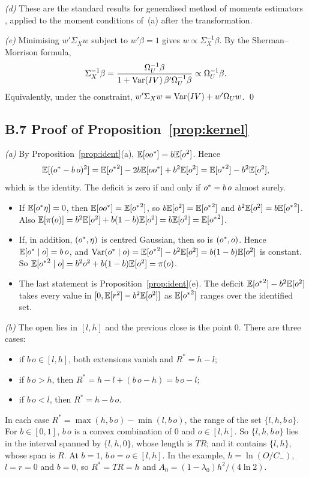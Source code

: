 \emph{(d)} These are the standard results for generalised method of moments estimators
\citep{Hansen1982}, applied to the moment conditions of~(a) after the transformation.

\emph{(e)} Minimising $w'\Sigma_Xw$ subject to $w'\beta=1$ gives $w\propto\Sigma_X^{-1}\beta$. By
the Sherman--Morrison formula,
\[
  \Sigma_X^{-1}\beta=\frac{\Omega_U^{-1}\beta}{1+\operatorname{Var}(IV)\,\beta'\Omega_U^{-1}\beta}\propto\Omega_U^{-1}\beta.
\]
Equivalently, under the constraint, $w'\Sigma_Xw=\operatorname{Var}(IV)+w'\Omega_Uw$. \qed

\subsection*{B.7 Proof of Proposition~\ref{prop:kernel}}

\emph{(a)} By Proposition~\ref{prop:ident}(a), $\mathbb{E}[o{o^{*}}]=b\mathbb{E}[o^2]$. Hence
\[
  \mathbb{E}[({o^{*}}-b\,o)^2]=\mathbb{E}[{o^{*}}^2]-2b\mathbb{E}[o{o^{*}}]+b^2\mathbb{E}[o^2]=\mathbb{E}[{o^{*}}^2]-b^2\mathbb{E}[o^2],
\]
which is the identity. The deficit is zero if and only if ${o^{*}}=b\,o$ almost surely.
\begin{itemize}
  \item If $\mathbb{E}[{o^{*}}\eta]=0$, then $\mathbb{E}[o{o^{*}}]=\mathbb{E}[{o^{*}}^2]$, so $b\mathbb{E}[o^2]=\mathbb{E}[{o^{*}}^2]$ and
        $b^2\mathbb{E}[o^2]=b\mathbb{E}[{o^{*}}^2]$. Also $\mathbb{E}[\pi(o)]=b^2\mathbb{E}[o^2]+b(1-b)\mathbb{E}[o^2]=b\mathbb{E}[o^2]=\mathbb{E}[{o^{*}}^2]$.
  \item If, in addition, $({o^{*}},\eta)$ is centred Gaussian, then so is $({o^{*}},o)$. Hence
        $\mathbb{E}[{o^{*}}\mid o]=b\,o$, and $\operatorname{Var}({o^{*}}\mid o)=\mathbb{E}[{o^{*}}^2]-b^2\mathbb{E}[o^2]=b(1-b)\mathbb{E}[o^2]$ is constant.
        So $\mathbb{E}[{o^{*}}^2\mid o]=b^2o^2+b(1-b)\mathbb{E}[o^2]=\pi(o)$.
  \item The last statement is Proposition~\ref{prop:ident}(e). The deficit
        $\mathbb{E}[{o^{*}}^2]-b^2\mathbb{E}[o^2]$ takes every value in $[0,\mathbb{E}[r^2]-b^2\mathbb{E}[o^2]]$ as $\mathbb{E}[{o^{*}}^2]$ ranges
        over the identified set.
\end{itemize}

\emph{(b)} The open lies in $[l,h]$ and the previous close is the point $0$. There are three cases:
\begin{itemize}
  \item if $b\,o\in[l,h]$, both extensions vanish and $R^*=h-l$;
  \item if $b\,o>h$, then $R^*=h-l+(b\,o-h)=b\,o-l$;
  \item if $b\,o<l$, then $R^*=h-b\,o$.
\end{itemize}
In each case $R^*=\max(h,b\,o)-\min(l,b\,o)$, the range of the set $\{l,h,b\,o\}$. For
$b\in[0,1]$, $b\,o$ is a convex combination of $0$ and $o\in[l,h]$. So $\{l,h,b\,o\}$ lies in the
interval spanned by $\{l,h,0\}$, whose length is $TR$; and it contains $\{l,h\}$, whose span is $R$.
At $b=1$, $b\,o=o\in[l,h]$. In the example, $h=\ln(O/C_{-})$, $l=r=0$ and $b=0$, so
$R^*=TR=h$ and $A_0=(1-\lambda_0)h^2/(4\ln2)$.

